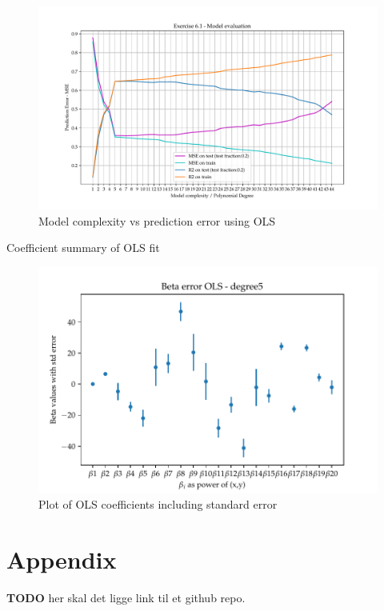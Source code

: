 \documentclass[11pt, a4paper]{article}
\begin{document}
\begin{figure}
  \centering
  \includegraphics[scale=0.62]{figures/EX6_EX1_OLS_evaluattion.pdf}
  \caption{Model complexity vs prediction error using OLS}
  \label{fig:EX6_1_OLS_fit}
\end{figure}

\begin{table}
  \centering
  \caption{Coefficient summary of OLS fit}
  \label{data:EX6_1_OLS_betas}
\end{table}

\begin{figure}
  \centering
  \includegraphics[scale=0.9]{figures/EX6_EX1_OLS_beta_error_degree5.pdf}
  \caption{Plot of OLS coefficients including standard error}
  \label{fig:EX6_1_OLS_betas_plot}
\end{figure}


\section*{Appendix\label{sec:A}}
\textbf{TODO} her skal det ligge link til et github repo. 

\newpage
\newpage



\end{document}
